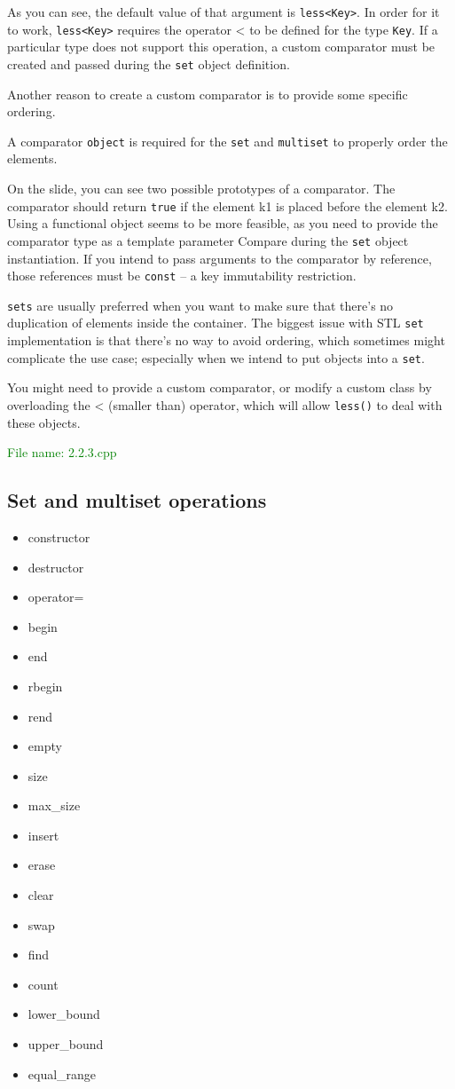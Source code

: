 As you can see, the default value of that argument is \texttt{less<Key>}. In order for it to work, 
\texttt{less<Key>} requires the operator < to be defined for the type \texttt{Key}. If a particular type 
does not support this operation, a custom comparator must be created and passed during the \texttt{set} 
object definition.

Another reason to create a custom comparator is to provide some specific ordering.

A comparator \texttt{object} is required for the \texttt{set} and \texttt{multiset} to properly order the elements.

On the slide, you can see two possible prototypes of a comparator. The comparator should return \texttt{true} 
if the element k1 is placed before the element k2. Using a functional object seems to be more feasible, 
as you need to provide the comparator type as a template parameter Compare during the \texttt{set} 
object instantiation. If you intend to pass arguments to the comparator by reference, those references 
must be \texttt{const} – a key immutability restriction.

\texttt{sets} are usually preferred when you want to make sure that there’s no duplication of elements 
inside the container. The biggest issue with STL \texttt{set} implementation is that there’s no way to 
avoid ordering, which sometimes might complicate the use case; especially when we intend to put objects 
into a \texttt{set}.

You might need to provide a custom comparator, or modify a custom class by overloading the < 
(smaller than) operator, which will allow \texttt{less()} to deal with these objects.

\textcolor{green}{File name: 2.2.3.cpp} 
 

\subsection{Set and multiset operations} %
\begin{itemize}
  \item constructor
  \item destructor
  \item operator=
  \item begin
  \item end
  \item rbegin
  \item rend
  \item empty
  \item size
  \item max\_size
  \item insert
  \item erase
  \item clear
  \item swap
  \item find
  \item count
  \item lower\_bound
  \item upper\_bound
  \item equal\_range
\end{itemize}

